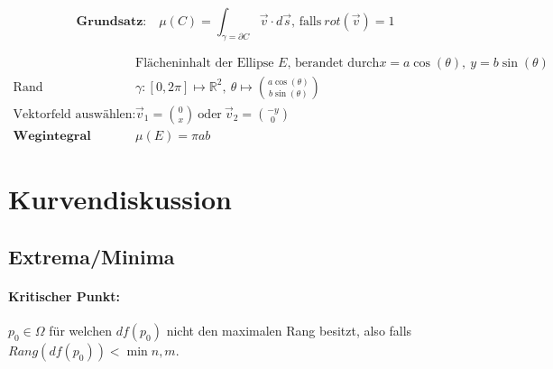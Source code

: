 \documentclass[11pt]{article}
\begin{document}
\begin{equation*}
	\textbf{Grundsatz:}\quad \mu(C) = \int_{\gamma = \partial C} \vec{v} \cdot d\vec{s}\text{, falls}\ rot(\vec{v}) = 1
\end{equation*}

\begin{equation*}
\begin{split}
	& \text{Fl{\"a}cheninhalt der Ellipse $E$, berandet durch} x = a\cos(\theta),\ y = b\sin(\theta) \\
	\text{Rand parametrisieren:}\quad & \gamma: [0, 2\pi] \mapsto \mathbb{R}^2,\ \theta \mapsto \binom{a\cos(\theta)}{b\sin(\theta)} \\
	\text{Vektorfeld ausw{\"a}hlen:}\quad & \vec{v}_1 = \binom{0}{x}\ \text{oder}\ \vec{v}_2 = \binom{-y}{0} \\
	\textbf{Wegintegral ausrechnen}\quad & \mu(E) = \pi ab
\end{split}
\end{equation*}

\section{Kurvendiskussion}

\subsection{Extrema/Minima}

\paragraph{Kritischer Punkt:} $p_0 \in \Omega$ f{\"u}r welchen $df(p_0)$ nicht den maximalen Rang besitzt, also falls $Rang(df(p_0)) < \min{n, m}$.
\end{document}
